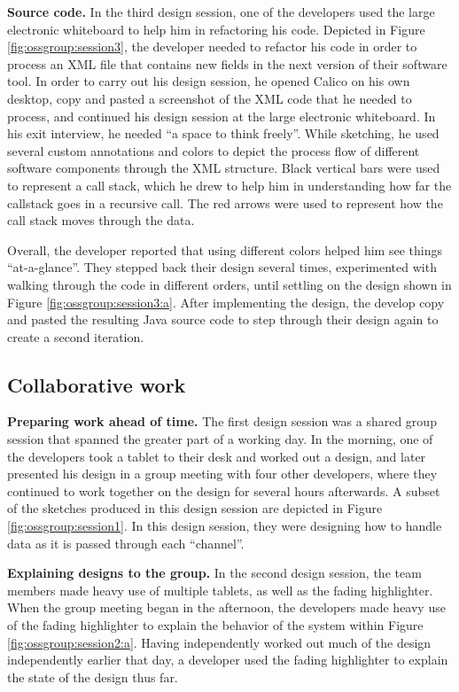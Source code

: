 \textbf{Source code. } In the third design session, one of the developers used the large electronic whiteboard to help him in refactoring his code. Depicted in Figure \ref{fig:ossgroup:session3}, the developer needed to refactor his code in order to process an XML file that contains new fields in the next version of their software tool. In order to carry out his design session, he opened Calico on his own desktop, copy and pasted a screenshot of the XML code that he needed to process, and continued his design session at the large electronic whiteboard. In his exit interview, he needed ``a space to think freely''. While sketching, he used several custom annotations and colors to depict the process flow of different software components through the XML structure. Black vertical bars were used to represent a call stack, which he drew to help him in understanding how far the callstack goes in a recursive call. The red arrows were used to represent how the call stack moves through the data.

Overall, the developer reported that using different colors helped him see things ``at-a-glance''. They stepped back their design several times, experimented with walking through the code in different orders, until settling on the design shown in Figure \ref{fig:ossgroup:session3:a}. After implementing the design, the develop copy and pasted the resulting Java source code to step through their design again to create a second iteration.

\subsection{Collaborative work}

\textbf{Preparing work ahead of time.} The first design session was a shared group session that spanned the greater part of a working day. In the morning, one of the developers took a tablet to their desk and worked out a design, and later presented his design in a group meeting with four other developers, where they continued to work together on the design for several hours afterwards. A subset of the sketches produced in this design session are depicted in Figure \ref{fig:ossgroup:session1}. In this design session, they were designing how to handle data as it is passed through each ``channel''.

\textbf{Explaining designs to the group.} In the second design session, the team members made heavy use of multiple tablets, as well as the fading highlighter. When the group meeting began in the afternoon, the developers made heavy use of the fading highlighter to explain the behavior of the system within Figure \ref{fig:ossgroup:session2:a}. Having independently worked out much of the design independently earlier that day, a developer used the fading highlighter to explain the state of the design thus far. 

